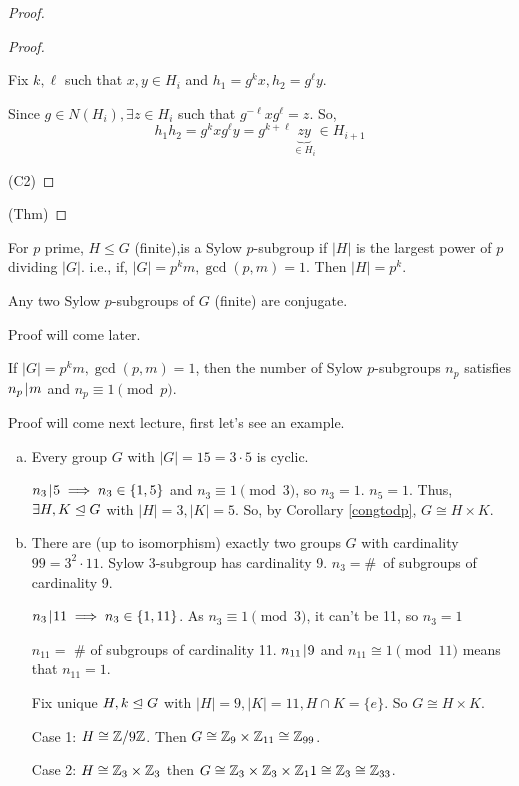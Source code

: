 \documentclass[notes.tex]{subfiles}
\begin{document}
\begin{proof}
\begin{proof}
\begin{itemize}
		Fix $k, \ell $ such that $x, y \in H_i$ and $h_1 = g^kx, h_2 = g^\ell y$.

		Since $g\in N(H_i), \exists z\in H_i$ such that $g^{-\ell}xg^\ell = z$.
		So, \[h_1h_2 = g^kxg^\ell y = g^{k+\ell}\underbrace{zy}_{\in H_i} \in H_{i+1}\] 
	\end{itemize}
	\qedhere(C2)
	\end{proof}
	\qedhere(Thm)
\end{proof}

\begin{defn}
	For $p$ prime, $H\le G$ (finite),is a Sylow $p$-subgroup if $|H|$ is the largest power of $p$ dividing $|G|$.
	i.e., if, $|G| = p^km, \gcd(p, m) = 1$. Then $|H| = p^k$.
\end{defn}

\begin{theorem}[Sylow 2]
\label{sylow2} Any two Sylow $p$-subgroups of $G$ (finite) are conjugate.
\end{theorem}
Proof will come later.

\begin{theorem}[Sylow 3]
	\label{sylow3}
	If $|G| = p^km, \gcd(p, m) = 1$, then the number of Sylow $p$-subgroups $n_p$ satisfies $n_p \mkern2mu|\mkern1mu m$ and $n_p\equiv 1 \pmod p$. 
\end{theorem}

Proof will come next lecture, first let's see an example.
\begin{eg}\leavevmode
	\begin{enumerate}[a)]
		\item Every group $G$ with $|G| = 15 = 3\cdot 5$ is cyclic.

		$n_3 \mkern2mu|\mkern1mu 5 \implies n_3 \in \{1, 5\}$ and $n_3 \equiv 1 \pmod 3$, so $n_3 = 1$.
		$n_5 = 1$. Thus, $\exists H, K\trianglelefteq G$ with $|H| = 3, |K| = 5$. So, by Corollary \ref{congtodp}, $G\cong H\times K$.
		\item There are (up to isomorphism) exactly two groups $G$ with cardinality $99 = 3^2\cdot 11$.
		Sylow 3-subgroup has cardinality 9. $n_3 = $\#~of subgroups of cardinality 9.

		$n_3 \mkern2mu|\mkern1mu 11\implies n_3\in \{1, 11\}$. As $n_3 \equiv 1\pmod 3$, it can't be 11, so $n_3 = 1$

		$n_{11} = $ \# of subgroups of cardinality 11. $n_{11} \mkern2mu|\mkern1mu 9$ and $n_{11}\cong 1 \pmod 11$ means that $n_{11} = 1$.

		Fix unique $H, k\trianglelefteq G$ with $|H| = 9, |K| = 11, H\cap K = \{e\}$.
		So $G \cong H\times K$.

		Case 1: $H\cong \mathbb{Z}/9\mathbb{Z}$. Then $G\cong \mathbb{Z}_9\times \mathbb{Z}_{11} \cong \mathbb{Z}_{99}$.

		Case 2: $H\cong \mathbb{Z}_3\times \mathbb{Z}_3$ then $G \cong \mathbb{Z}_3\times\mathbb{Z}_3 \times \mathbb{Z}_11\cong \mathbb{Z}_3\cong \mathbb{Z}_{33}$.
	\end{enumerate}
\end{eg}
\end{document}
